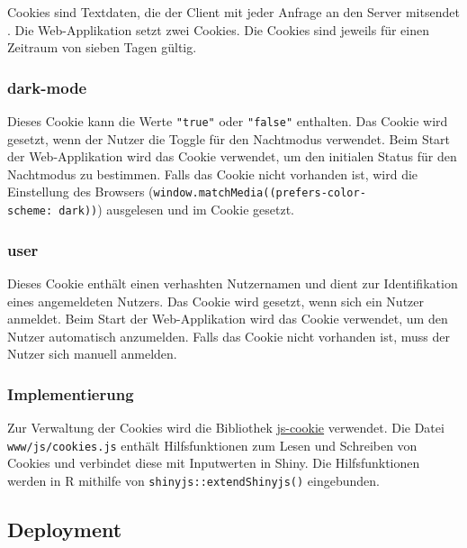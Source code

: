 \documentclass[
]{article}
\begin{document}
Cookies sind Textdaten, die der Client mit jeder Anfrage an den Server mitsendet \autocite{cookies}. Die Web-Applikation setzt zwei Cookies. Die Cookies sind jeweils für einen Zeitraum von sieben Tagen gültig.

\hypertarget{dark-mode}{%
\subsubsection{dark-mode}\label{dark-mode}}

Dieses Cookie kann die Werte \texttt{"true"} oder \texttt{"false"} enthalten. Das Cookie wird gesetzt, wenn der Nutzer die Toggle für den Nachtmodus verwendet. Beim Start der Web-Applikation wird das Cookie verwendet, um den initialen Status für den Nachtmodus zu bestimmen. Falls das Cookie nicht vorhanden ist, wird die Einstellung des Browsers (\texttt{window.matchMedia(\textquotesingle{}(prefers-color-scheme:\ dark)\textquotesingle{})}) ausgelesen und im Cookie gesetzt.

\hypertarget{user-1}{%
\subsubsection{user}\label{user-1}}

Dieses Cookie enthält einen verhashten Nutzernamen und dient zur Identifikation eines angemeldeten Nutzers. Das Cookie wird gesetzt, wenn sich ein Nutzer anmeldet. Beim Start der Web-Applikation wird das Cookie verwendet, um den Nutzer automatisch anzumelden. Falls das Cookie nicht vorhanden ist, muss der Nutzer sich manuell anmelden.

\hypertarget{implementierung}{%
\subsubsection{Implementierung}\label{implementierung}}

Zur Verwaltung der Cookies wird die Bibliothek \href{https://github.com/js-cookie/js-cookie}{js-cookie} \autocite{js-cookie} verwendet. Die Datei \texttt{www/js/cookies.js} enthält Hilfsfunktionen zum Lesen und Schreiben von Cookies und verbindet diese mit Inputwerten in Shiny. Die Hilfsfunktionen werden in R mithilfe von \texttt{shinyjs::extendShinyjs()} eingebunden.

\hypertarget{deployment-1}{%
\subsection{Deployment}\label{deployment-1}}
\end{document}
